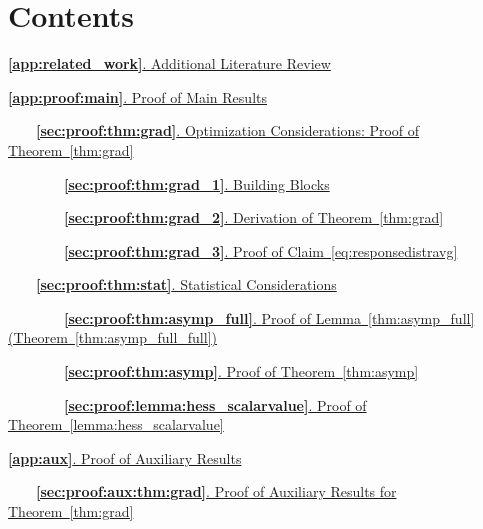 
\section*{Contents}

{\footnotesize
\hyperref[app:related_work]{\textbf{\ref{app:related_work}}.
Additional Literature Review}
\dotfill
\pageref{app:related_work}


\hyperref[app:proof:main]
{\textbf{\ref{app:proof:main}}.
Proof of Main Results}
\dotfill
\pageref{app:proof:main}

~~~~\hyperref[sec:proof:thm:grad]
{\textbf{\ref{sec:proof:thm:grad}}.
Optimization Considerations: Proof of Theorem~\ref{thm:grad}}
\dotfill
\pageref{sec:proof:thm:grad}

~~~~~~~~\hyperref[sec:proof:thm:grad_1]
{\textbf{\ref{sec:proof:thm:grad_1}}.
Building Blocks}
\dotfill
\pageref{sec:proof:thm:grad_1}

~~~~~~~~\hyperref[sec:proof:thm:grad_2]
{\textbf{\ref{sec:proof:thm:grad_2}}.
Derivation of Theorem~\ref{thm:grad}}
\dotfill
\pageref{sec:proof:thm:grad_2}

~~~~~~~~\hyperref[sec:proof:thm:grad_3]
{\textbf{\ref{sec:proof:thm:grad_3}}.
Proof of Claim~\eqref{eq:responsedistravg}}
\dotfill
\pageref{sec:proof:thm:grad_3}

~~~~\hyperref[sec:proof:thm:stat]
{\textbf{\ref{sec:proof:thm:stat}}.
Statistical Considerations}
\dotfill
\pageref{sec:proof:thm:stat}

~~~~~~~~\hyperref[sec:proof:thm:asymp_full]
{\textbf{\ref{sec:proof:thm:asymp_full}}.
Proof of Lemma~\ref{thm:asymp_full} (Theorem~\ref{thm:asymp_full_full})}
\dotfill
\pageref{sec:proof:thm:asymp_full}

~~~~~~~~\hyperref[sec:proof:thm:asymp]
{\textbf{\ref{sec:proof:thm:asymp}}.
Proof of Theorem~\ref{thm:asymp}}
\dotfill
\pageref{sec:proof:thm:asymp}

~~~~~~~~\hyperref[sec:proof:lemma:hess_scalarvalue]
{\textbf{\ref{sec:proof:lemma:hess_scalarvalue}}.
Proof of Theorem~\ref{lemma:hess_scalarvalue}}
\dotfill
\pageref{sec:proof:lemma:hess_scalarvalue}

\hyperref[app:aux]
{\textbf{\ref{app:aux}}.
Proof of Auxiliary Results}
\dotfill
\pageref{app:aux}

~~~~\hyperref[sec:proof:aux:thm:grad]
{\textbf{\ref{sec:proof:aux:thm:grad}}.
Proof of Auxiliary Results for Theorem~\ref{thm:grad}}
\dotfill
\pageref{sec:proof:aux:thm:grad}

}
